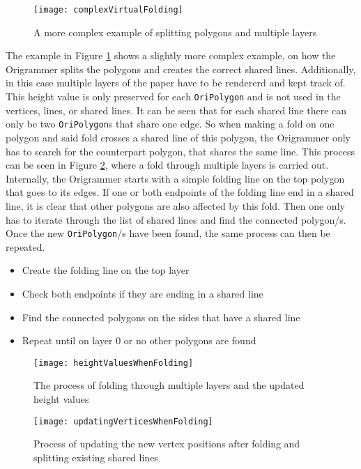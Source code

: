 \newpage

 \begin{figure}[htbp]
	\centering
	\texttt{[image: complexVirtualFolding]}
	\caption{A more complex example of splitting polygons and multiple layers}
	\label{fig:complexVirtualFolding}
\end{figure}

The example in Figure \ref{fig:complexVirtualFolding} shows a slightly more complex example, on how the Origrammer splits the polygons and creates the correct shared lines. Additionally, in this case multiple layers of the paper have to be rendererd and kept track of. This height value is only preserved for each \texttt{OriPolygon} and is not used in the vertices, lines, or shared lines. It can be seen that for each shared line there can only be two \texttt{OriPolygon}s that share one edge. So when making a fold on one polygon and said fold crosses a shared line of this polygon, the Origrammer only has to search for the counterpart polygon, that shares the same line. This process can be seen in Figure \ref{fig:heightValuesWhenFolding}, where a fold through multiple layers is carried out. Internally, the Origrammer starts with a simple folding line on the top polygon that goes to its edges. If one or both endpoints of the folding line end in a shared line, it is clear that other polygons are also affected by this fold. Then one only has to iterate through the list of shared lines and find the connected polygon/s. Once the new \texttt{OriPolygon}/s have been found, the same process can then be repeated.


\begin{itemize}
\item Create the folding line on the top layer
\item Check both endpoints if they are ending in a shared line
\item Find the connected polygons on the sides that have a shared line
\item Repeat until on layer 0 or no other polygons are found

\end{itemize}



 \begin{figure}[htbp]
	\centering
	\texttt{[image: heightValuesWhenFolding]}
	\caption{The process of folding through multiple layers and the updated height values}
	\label{fig:heightValuesWhenFolding}
\end{figure}



 \begin{figure}[htbp]
	\centering
	\texttt{[image: updatingVerticesWhenFolding]}
	\caption{Process of updating the new vertex positions after folding and splitting existing shared lines}
	\label{fig:updatingVerticesWhenFolding}
\end{figure}
